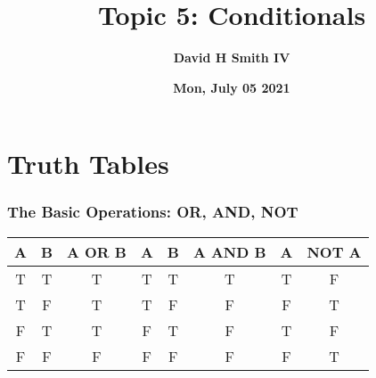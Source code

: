 \documentclass{beamer}
\title{\textbf{Topic 5: Conditionals}}
\author{\textbf{David H Smith IV}}
\institute[\textbf{UIUC}]{\textbf{University of Illinois Urbana-Champaign}}
\date{\textbf{Mon, July 05 2021}}
\begin{document}
\frame{\titlepage}

\section{Truth Tables}

%
%
\begin{frame}[fragile]
	\frametitle{The Basic Operations: OR, AND, NOT}
	\centering

	\begin{table}[]
		\begin{tabular}{|ccc|ccc|cc|}
			{\color[HTML]{CD9934} \textbf{A}} & {\color[HTML]{3531FF} \textbf{B}} & \textbf{A OR B} & {\color[HTML]{CD9934} \textbf{A}} & {\color[HTML]{3531FF} \textbf{B}} & \textbf{A AND B} & {\color[HTML]{CD9934} \textbf{A}} & \textbf{NOT A} \\ \hline
			{\color[HTML]{CD9934} T}          & {\color[HTML]{3531FF} T}          & T               & {\color[HTML]{CD9934} T}          & {\color[HTML]{3531FF} T}          & T                & {\color[HTML]{CD9934} T}          & F              \\
			{\color[HTML]{CD9934} T}          & {\color[HTML]{3531FF} F}          & T               & {\color[HTML]{CD9934} T}          & {\color[HTML]{3531FF} F}          & F                & {\color[HTML]{CD9934} F}          & T              \\
			{\color[HTML]{CD9934} F}          & {\color[HTML]{3531FF} T}          & T               & {\color[HTML]{CD9934} F}          & {\color[HTML]{3531FF} T}          & F                & {\color[HTML]{CD9934} T}          & F              \\
			{\color[HTML]{CD9934} F}          & {\color[HTML]{3531FF} F}          & F               & {\color[HTML]{CD9934} F}          & {\color[HTML]{3531FF} F}          & F                & {\color[HTML]{CD9934} F}          & T             
		\end{tabular}
	\end{table}
\end{frame}
\end{document}
